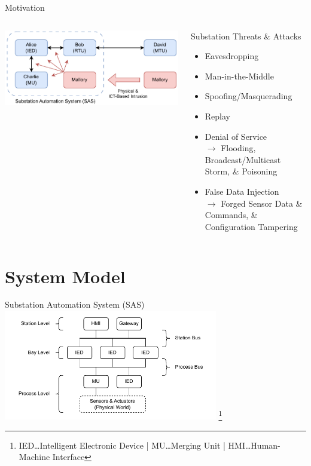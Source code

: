 \documentclass[en]{sdqbeamer}
\newcommand\nonumberfootnote[1]{%
  \begingroup
  \renewcommand\thefootnote{}\footnote{#1}%
  \addtocounter{footnote}{-1}%
  \endgroup
}
\begin{document}
\begin{frame}{Motivation}
    \begin{columns}
        \centering
        \includegraphics[width=1.0\textwidth]{./figures/sas_intrusion.drawio.pdf}
        \begin{redblock}{Substation Threats \& Attacks}
            \begin{itemize}
                \item Eavesdropping
                \item Man-in-the-Middle
                \item Spoofing/Masquerading
                \item Replay
                \item Denial of Service\\$\rightarrow$ Flooding, Broadcast/Multicast Storm, \& Poisoning
                \item False Data Injection\\$\rightarrow$ Forged Sensor Data \& Commands, \& Configuration Tampering
            \end{itemize}
        \end{redblock}
    \end{columns}
\end{frame}

\section{System Model}
\begin{frame}{Substation Automation System (SAS)}
    \centering
	\includegraphics[width=0.7\textwidth]{./figures/substation_architecture.drawio.pdf}
    \nonumberfootnote{IED\dots Intelligent Electronic Device | MU\dots Merging Unit | HMI\dots Human-Machine Interface}
\end{frame}
\end{document}
